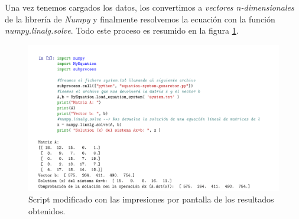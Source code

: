 \documentclass[12pt,twoside]{article}
\begin{document}
Una vez tenemos cargados los datos, los convertimos a \textit{vectores n-dimensionales} de la librería de \textit{Numpy} y finalmente resolvemos la ecuación con la función \textit{numpy.linalg.solve}.
Todo este proceso es resumido en la figura \ref{fig:fig6}.

\begin{figure}[hbt]
\begin{center}
	\includegraphics[width=1\textwidth]{task2.png}

	\caption{Script modificado con las impresiones por pantalla de los resultados obtenidos.}
	\label{fig:fig6}
\end{center}
\end{figure}


\end{document}
